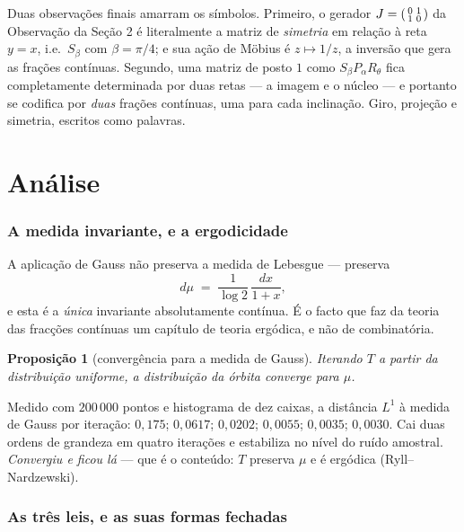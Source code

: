 \documentclass[11pt,a4paper]{article}
\theoremstyle{plain}
\newtheorem{proposicao}[teorema]{Proposição}
\theoremstyle{definition}
\theoremstyle{remark}
\begin{document}
Duas observações finais amarram os símbolos. Primeiro, o gerador $J=\begin{psmallmatrix}0&1\\1&0
\end{psmallmatrix}$ da Observação da Seção 2 é literalmente a matriz de \emph{simetria} em relação
à reta $y=x$, i.e.\ $S_\beta$ com $\beta = \pi/4$; e sua ação de Möbius é $z \mapsto 1/z$, a
inversão que gera as frações contínuas. Segundo, uma matriz de posto $1$ como
$S_\beta P_\alpha R_\theta$ fica completamente determinada por duas retas --- a imagem e o núcleo
--- e portanto se codifica por \emph{duas} frações contínuas, uma para cada inclinação. Giro,
projeção e simetria, escritos como palavras.




\part{Análise}



\section{A medida invariante, e a ergodicidade}\label{sec:medida}

A aplicação de Gauss não preserva a medida de Lebesgue --- preserva
\[
  d\mu \;=\; \frac{1}{\log 2}\,\frac{dx}{1+x} ,
\]
e esta é a \emph{única} invariante absolutamente contínua. É o facto que faz da teoria das fracções
contínuas um capítulo de teoria ergódica, e não de combinatória.

\begin{proposicao}[convergência para a medida de Gauss]\label{prop:gauss}
Iterando $T$ a partir da distribuição uniforme, a distribuição da órbita converge para $\mu$.
\end{proposicao}

\noindent Medido com $200\,000$ pontos e histograma de dez caixas, a distância $L^1$ à medida de
Gauss por iteração: $0{,}175$; $0{,}0617$; $0{,}0202$; $0{,}0055$; $0{,}0035$; $0{,}0030$. Cai duas
ordens de grandeza em quatro iterações e estabiliza no nível do ruído amostral. \emph{Convergiu e
ficou lá} --- que é o conteúdo: $T$ preserva $\mu$ e é ergódica (Ryll--Nardzewski).

\section{As três leis, e as suas formas fechadas}\label{sec:leis}
\end{document}
